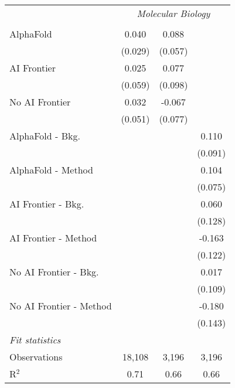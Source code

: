 \begin{tabular}{lccc}
 & \multicolumn{3}{c}{\textit{Molecular Biology}} \\ \\
   AlphaFold               & 0.040   & 0.088   &   \\   
                           & (0.029) & (0.057) &   \\   
   AI Frontier             & 0.025   & 0.077   &   \\   
                           & (0.059) & (0.098) &   \\   
   No AI Frontier          & 0.032   & -0.067  &   \\   
                           & (0.051) & (0.077) &   \\   
   AlphaFold - Bkg.        &         &         & 0.110\\   
                           &         &         & (0.091)\\   
   AlphaFold - Method      &         &         & 0.104\\   
                           &         &         & (0.075)\\   
   AI Frontier - Bkg.      &         &         & 0.060\\   
                           &         &         & (0.128)\\   
   AI Frontier - Method    &         &         & -0.163\\   
                           &         &         & (0.122)\\   
   No AI Frontier - Bkg.   &         &         & 0.017\\   
                           &         &         & (0.109)\\   
   No AI Frontier - Method &         &         & -0.180\\   
                           &         &         & (0.143)\\   
   \midrule
   \emph{Fit statistics}\\
   Observations            & 18,108  & 3,196   & 3,196\\  
   R$^2$                   & 0.71    & 0.66    & 0.66\\  
   

\end{tabular}
